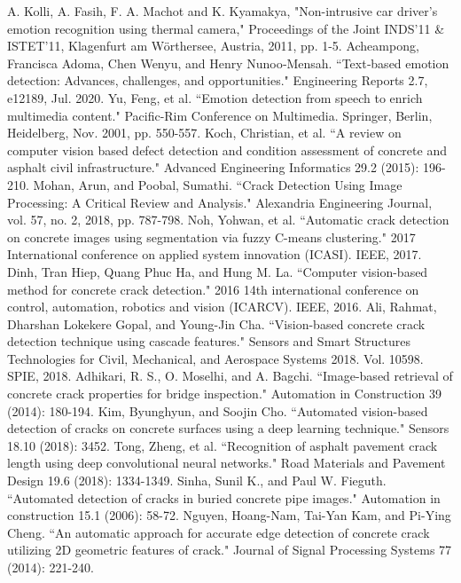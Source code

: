 \begin{thebibliography}{00}
 A. Kolli, A. Fasih, F. A. Machot and K. Kyamakya, "Non-intrusive car driver's emotion recognition using thermal camera," Proceedings of the Joint INDS'11 \& ISTET'11, Klagenfurt am Wörthersee, Austria, 2011, pp. 1-5.
 Acheampong, Francisca Adoma, Chen Wenyu, and Henry Nunoo‐Mensah. ``Text‐based emotion detection: Advances, challenges, and opportunities." Engineering Reports 2.7, e12189, Jul. 2020.
 Yu, Feng, et al. ``Emotion detection from speech to enrich multimedia content." Pacific-Rim Conference on Multimedia. Springer, Berlin, Heidelberg, Nov. 2001, pp. 550-557.
 Koch, Christian, et al. ``A review on computer vision based defect detection and condition assessment of concrete and asphalt civil infrastructure." Advanced Engineering Informatics 29.2 (2015): 196-210.
 Mohan, Arun, and Poobal, Sumathi. ``Crack Detection Using Image Processing: A Critical Review and Analysis." Alexandria Engineering Journal, vol. 57, no. 2, 2018, pp. 787-798.
 Noh, Yohwan, et al. ``Automatic crack detection on concrete images using segmentation via fuzzy C-means clustering." 2017 International conference on applied system innovation (ICASI). IEEE, 2017.
 Dinh, Tran Hiep, Quang Phuc Ha, and Hung M. La. ``Computer vision-based method for concrete crack detection." 2016 14th international conference on control, automation, robotics and vision (ICARCV). IEEE, 2016.
 Ali, Rahmat, Dharshan Lokekere Gopal, and Young-Jin Cha. ``Vision-based concrete crack detection technique using cascade features." Sensors and Smart Structures Technologies for Civil, Mechanical, and Aerospace Systems 2018. Vol. 10598. SPIE, 2018.
 Adhikari, R. S., O. Moselhi, and A. Bagchi. ``Image-based retrieval of concrete crack properties for bridge inspection." Automation in Construction 39 (2014): 180-194.
 Kim, Byunghyun, and Soojin Cho. ``Automated vision-based detection of cracks on concrete surfaces using a deep learning technique." Sensors 18.10 (2018): 3452.
 Tong, Zheng, et al. ``Recognition of asphalt pavement crack length using deep convolutional neural networks." Road Materials and Pavement Design 19.6 (2018): 1334-1349.
 Sinha, Sunil K., and Paul W. Fieguth. ``Automated detection of cracks in buried concrete pipe images." Automation in construction 15.1 (2006): 58-72.
 Nguyen, Hoang-Nam, Tai-Yan Kam, and Pi-Ying Cheng. ``An automatic approach for accurate edge detection of concrete crack utilizing 2D geometric features of crack." Journal of Signal Processing Systems 77 (2014): 221-240.

\end{thebibliography}
